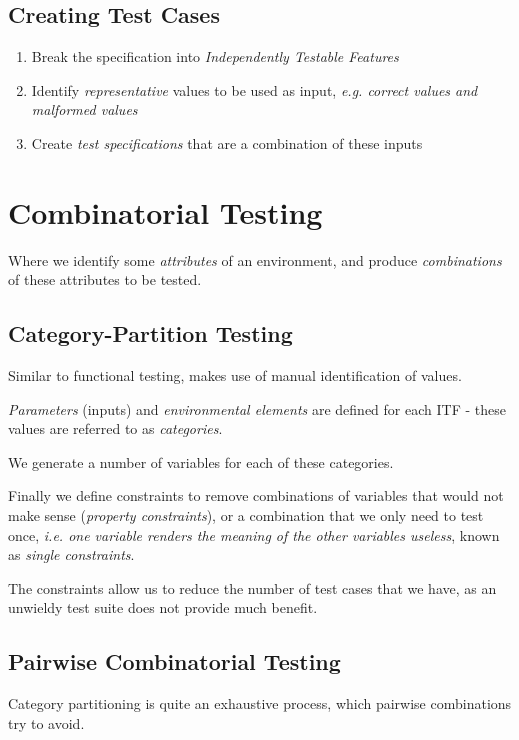 \documentclass{article}
\begin{document}
\subsection{Creating Test Cases}

\begin{enumerate}
\item
  Break the specification into \textit{Independently Testable Features}
\item 
  Identify \textit{representative} values to be used as input, \textit{e.g. correct values and malformed values}
\item
  Create \textit{test specifications} that are a combination of these inputs
\end{enumerate}

\section{Combinatorial Testing}

Where we identify some \textit{attributes} of an environment, and produce \textit{combinations} of these attributes to be tested.

\subsection{Category-Partition Testing}

Similar to functional testing, makes use of manual identification of values.

\textit{Parameters} (inputs) and \textit{environmental elements} are defined for each ITF - these values are referred to as \textit{categories}.

We generate a number of variables for each of these categories.

Finally we define constraints to remove combinations of variables that would not make sense (\textit{property constraints}), or a combination that we only need to test once, \textit{i.e. one variable renders the meaning of the other variables useless}, known as \textit{single constraints}.

The constraints allow us to reduce the number of test cases that we have, as an unwieldy test suite does not provide much benefit.

\subsection{Pairwise Combinatorial Testing}

Category partitioning is quite an exhaustive process, which pairwise combinations try to avoid.
\end{document}
